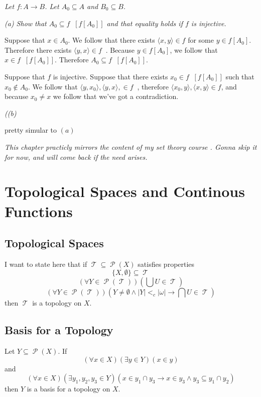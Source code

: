 \documentclass[11pt,oneside,titlepage]{book}
\DeclareMathOperator \pow {\mathcal {P}}
\DeclareMathOperator \topol {\mathcal {T}}
\DeclareMathOperator \inv {^{-1}}
\newcommand{\eangle}[1]{\langle #1 \rangle}
\newcommand{\set}[1]{\{ #1 \}}
\begin{document}
\textit{Let $f: A \to B$. Let $A_0 \subseteq A$ and $B_0 \subseteq B$.}

\textit{(a) Show that $A_0 \subseteq f\inv[f[A_0]]$ and that equality holds
  if $f$ is injective.}

Suppose that $x \in A_0$. We follow that there exists $\eangle{x, y} \in f$ for some
$y \in f[A_0]$. Therefore there exists $\eangle{y, x} \in f\inv$. Because $y \in f[A_0]$,
we follow that $x \in f\inv[f[A_0]]$. Therefore $A_0 \subseteq f\inv[f[A_0]]$.

Suppose that $f$ is injective. Suppose that there exists $x_0 \in f\inv[f[A_0]]$ such that
$x_0 \notin A_0$. We follow that $\eangle{y, x_0}, \eangle{y, x}, \in f\inv$,
therefore $\eangle{x_0, y}, \eangle{x, y} \in f$, and because $x_0 \neq x$ we follow
that we've got a contradiction.

\textit{((b) }

pretty simular to $(a)$

\textit{This chapter practicly mirrors the content of my set theory course
  . Gonna skip it for now, and will come back if the need arises.}

\chapter{Topological Spaces and Continous Functions}

\section{Topological Spaces}

I want to state here that if $\topol \subseteq \pow(X)$ satisfies
properties
$$\set{X, \emptyset} \subseteq \topol$$
$$(\forall Y \in \pow(\topol))( \bigcup{U} \in \topol)$$
$$(\forall Y \in \pow(\topol))(Y \neq \emptyset \land |Y| <_c
|\omega|  \to \bigcap{U} \in \topol)$$
then $\topol$ is a topology on $X$.

\section{Basis for a Topology}

Let $Y \subseteq \pow(X)$. If
$$(\forall x \in X)(\exists y \in Y)(x \in y)$$
and
$$(\forall x \in X)(\exists y_1, y_2, y_3 \in Y)(x \in y_1 \cap y_3 \to
x \in y_3 \land y_3 \subseteq y_1 \cap y_2)$$
then $Y$ is a basis for a topology on $X$.

\subsection{}
\end{document}
